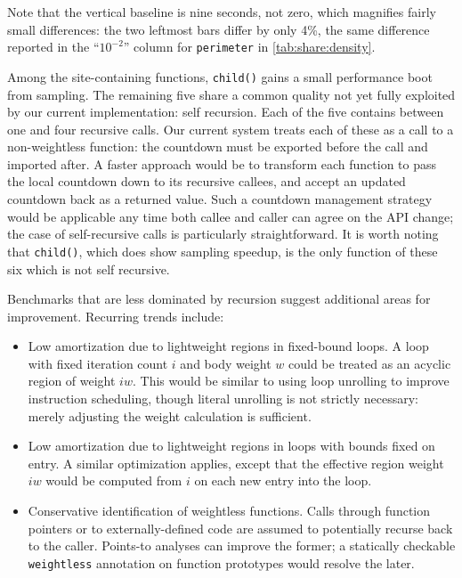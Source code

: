 Note that the vertical baseline is nine seconds, not zero, which
magnifies fairly small differences: the two leftmost bars differ by
only 4\%, the same difference reported in the ``$10^{-2}$'' column for
\texttt{perimeter} in \autoref{tab:share:density}.

Among the site-containing functions, \texttt{child()} gains a small
performance boot from sampling.  The remaining five share a common
quality not yet fully exploited by our current implementation: self
recursion.  Each of the five contains between one and four recursive
calls.  Our current system treats each of these as a call to a
non-weightless function: the countdown must be exported before the
call and imported after.  A faster approach would be to transform each
function to pass the local countdown down to its recursive callees,
and accept an updated countdown back as a returned value.  Such a
countdown management strategy would be applicable any time both callee
and caller can agree on the API change; the case of self-recursive
calls is particularly straightforward.  It is worth noting that
\texttt{child()}, which does show sampling speedup, is the only
function of these six which is not self recursive.

Benchmarks that are less dominated by recursion suggest additional
areas for improvement.  Recurring trends include:

\begin{itemize}
\item Low amortization due to lightweight regions in fixed-bound
  loops.  A loop with fixed iteration count $i$ and body weight $w$
  could be treated as an acyclic region of weight $iw$.  This would be
  similar to using loop unrolling to improve instruction scheduling,
  though literal unrolling is not strictly necessary: merely adjusting
  the weight calculation is sufficient.
  
\item Low amortization due to lightweight regions in loops with bounds
  fixed on entry.  A similar optimization applies, except that the
  effective region weight $iw$ would be computed from $i$ on each new
  entry into the loop.
  
\item Conservative identification of weightless functions.  Calls
  through function pointers or to externally-defined code are assumed
  to potentially recurse back to the caller.  Points-to analyses can
  improve the former; a statically checkable \texttt{weightless}
  annotation on function prototypes would resolve the later.
\end{itemize}

